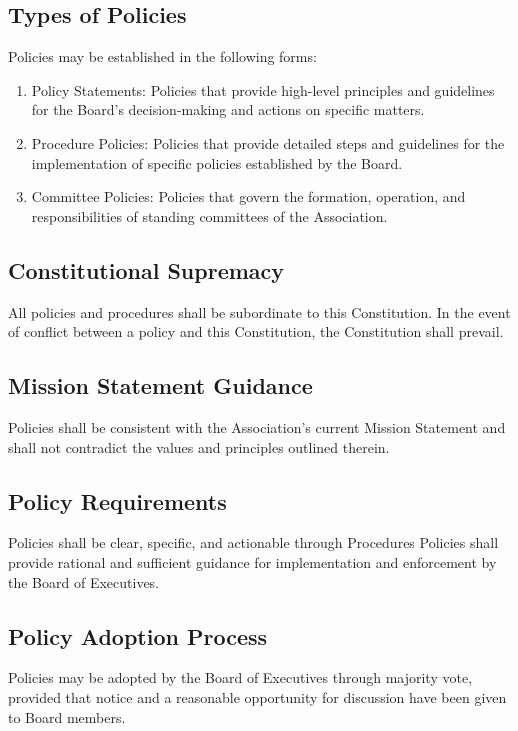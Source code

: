 \subsection{Types of Policies}
Policies may be established in the following forms:
\begin{enumerate}
    \item Policy Statements: Policies that provide high-level principles and 
    guidelines for the Board's decision-making and actions on specific matters.

    \item Procedure Policies: Policies that provide detailed steps and 
    guidelines for the implementation of specific policies established by the Board.

    \item Committee Policies: Policies that govern the formation, operation, and
    responsibilities of standing committees of the Association.
\end{enumerate}

\subsection{Constitutional Supremacy}
All policies and procedures shall be subordinate to this Constitution. 
In the event of conflict between a policy and this Constitution, 
the Constitution shall prevail.

\subsection{Mission Statement Guidance}
Policies shall be consistent with the Association's current Mission Statement
and shall not contradict the values and principles outlined therein.

\subsection{Policy Requirements}
Policies shall be clear, specific, and actionable through Procedures
Policies shall provide rational and sufficient guidance for implementation 
and enforcement by the Board of Executives.

\subsection{Policy Adoption Process}
Policies may be adopted by the Board of Executives through majority vote, 
provided that notice and a reasonable opportunity for discussion have been 
given to Board members.

